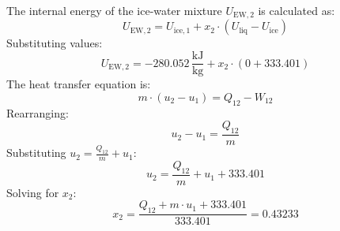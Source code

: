 The internal energy of the ice-water mixture \( U_{\text{EW},2} \) is calculated as:  
\[
U_{\text{EW},2} = U_{\text{ice},1} + x_2 \cdot (U_{\text{liq}} - U_{\text{ice}})
\]  
Substituting values:  
\[
U_{\text{EW},2} = -280.052 \, \frac{\text{kJ}}{\text{kg}} + x_2 \cdot (0 + 333.401)
\]  
The heat transfer equation is:  
\[
m \cdot (u_2 - u_1) = Q_{12} - W_{12}
\]  
Rearranging:  
\[
u_2 - u_1 = \frac{Q_{12}}{m}
\]  
Substituting \( u_2 = \frac{Q_{12}}{m} + u_1 \):  
\[
u_2 = \frac{Q_{12}}{m} + u_1 + 333.401
\]  
Solving for \( x_2 \):  
\[
x_2 = \frac{Q_{12} + m \cdot u_1 + 333.401}{333.401} = 0.43233
\]